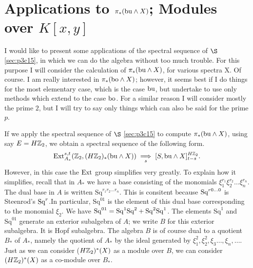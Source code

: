 \documentclass[../main]{subfiles}
\begin{document}


\chapter{Applications to \texorpdfstring{$\pi_{\ast}(\mathrm{bu} \wedge X)$}{pi(bu wedge X)}; Modules over \texorpdfstring{$K[x, y]$}{K[x,y]}}
 
\label{sec:p3c16}
 I would like to present some applications of the spectral sequence of $\S$ \ref{sec:p3c15}, in which we can do the algebra without too much trouble. For this purpose I will consider the calculation of $\pi_{\ast}(\mathrm{bu} \wedge X)$, for various spectra X. Of course. I am really interested in $\pi_{\ast}(\mathrm{bo} \wedge X)$; however, it seems best if I do things for the most elementary case, which is the case $\mathrm{bu}$, but undertake to use only methods which extend to the case $\mathrm{bo}$. For a similar reason I will consider mostly the prime $2$, but I will try to say only things which can also be said for the prime $p$.

If we apply the spectral sequence of $\S$ \ref{sec:p3c15} to compute $\pi_{\ast}(\mathrm{bu} \wedge X)$, using say $E=H\mathbb{Z}_2$, we obtain a spectral sequence of the following form. \begin{equation*}
    \mathrm{Ext}_{A_\ast}^{s, t} (\mathbb{Z}_2, (H\mathbb{Z}_2)_{\ast}(\mathrm{bu} \wedge X)) \underset{s}{\implies} [S, \mathrm{bu} \wedge X ]_{t-s}^{H\mathbb{Z}_2}.
\end{equation*}
However, in this case the $\mathrm{Ext}$ group simplifies very greatly. To explain how it simplifies, recall that in $A_{\ast}$ we have a base consisting of the monomials $\xi_{1}^{r_{1}}\xi_{2}^{r_{2}}\dots \xi_{n}^{r_{n}}$. The dual base in $A$ is written 
$\mathrm{Sq}^{r_{1}r_{2}\dots r_{n}}$. This is consitent because $\mathrm{Sq}^{r0\dots 0}$ is Steenrod's $\mathrm{Sq}^r$.In particular, $\mathrm{Sq}^{01}$ is the element of this dual base corresponding to the monomial $\xi_{2}$. We have $\mathrm{Sq}^{01}=\mathrm{Sq}^{1}\mathrm{Sq}^{2}+\mathrm{Sq}^{2}\mathrm{Sq}^{1}$. The elements $\mathrm{Sq}^{1}$ and $\mathrm{Sq}^{01}$ generate an exterior subalgebra of $A$; we write $B$ for this exterior subalgebra. It is Hopf subalgebra. The algebra $B$ is of course dual to a quotient $B_{\ast}$ of $A_{\ast}$, namely the quotient of $A_{\ast}$ by the ideal generated by $\xi_{1}^2, \xi_{2}^2, \xi_{3}\dots, \xi_{n}, \dots $. Just as we can consider ($H\mathbb{Z}_2)^{\ast}(X)$ as a module over $B$, we can consider $(H\mathbb{Z}_2)^{\ast}(X)$ as a 
co-module over $B_{\ast}$.
\end{document}
